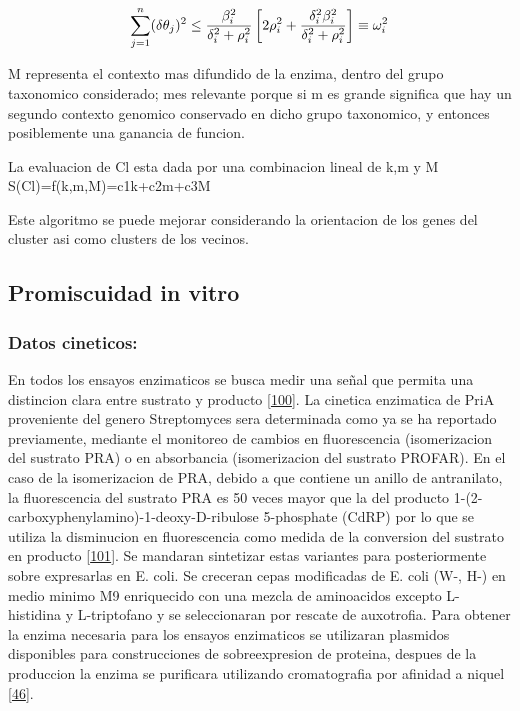 \documentclass[12pt,twoside]{reedthesis}
\begin{document}
  \[\sum_{j=1}^n (\delta\theta_j)^2 \leq {{\beta_i^2}\over{\delta_i^2 + \rho_i^2}}
  \left[ 2\rho_i^2 + {\delta_i^2\beta_i^2\over{\delta_i^2 + \rho_i^2}} \right] \equiv \omega_i^2\]
  
  M representa el contexto mas difundido de la enzima, dentro del grupo
  taxonomico considerado; mes relevante porque si m es grande significa
  que hay un segundo contexto genomico conservado en dicho grupo
  taxonomico, y entonces posiblemente una ganancia de funcion.
  
  La evaluacion de Cl esta dada por una combinacion lineal de k,m y M\\
  S(Cl)=f(k,m,M)=c1k+c2m+c3M
  
  Este algoritmo se puede mejorar considerando la orientacion de los genes
  del cluster asi como clusters de los vecinos.
  
  \subsection{Promiscuidad in vitro}\label{promiscuidad-in-vitro}
  
  \subsubsection{Datos cineticos:}\label{datos-cineticos}
  
  En todos los ensayos enzimaticos se busca medir una señal que permita
  una distincion clara entre sustrato y producto
  {[}\protect\hyperlink{ref-bisswanger_general_2011}{100}{]}. La cinetica
  enzimatica de PriA proveniente del genero Streptomyces sera determinada
  como ya se ha reportado previamente, mediante el monitoreo de cambios en
  fluorescencia (isomerizacion del sustrato PRA) o en absorbancia
  (isomerizacion del sustrato PROFAR). En el caso de la isomerizacion de
  PRA, debido a que contiene un anillo de antranilato, la fluorescencia
  del sustrato PRA es 50 veces mayor que la del producto
  1-(2-carboxyphenylamino)-1-deoxy-D-ribulose 5-phosphate (CdRP) por lo
  que se utiliza la disminucion en fluorescencia como medida de la
  conversion del sustrato en producto
  {[}\protect\hyperlink{ref-hommel_phosphoribosyl_1995}{101}{]}. Se
  mandaran sintetizar estas variantes para posteriormente sobre
  expresarlas en E. coli. Se creceran cepas modificadas de E. coli (W-,
  H-) en medio minimo M9 enriquecido con una mezcla de aminoacidos excepto
  L-histidina y L-triptofano y se seleccionaran por rescate de auxotrofia.
  Para obtener la enzima necesaria para los ensayos enzimaticos se
  utilizaran plasmidos disponibles para construcciones de sobreexpresion
  de proteina, despues de la produccion la enzima se purificara utilizando
  cromatografia por afinidad a niquel
  {[}\protect\hyperlink{ref-verduzco-castro_co-occurrence_2016}{46}{]}.
  
\end{document}
